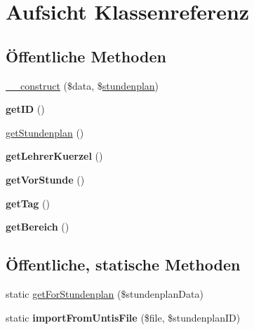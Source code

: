 \hypertarget{class_aufsicht}{}\section{Aufsicht Klassenreferenz}
\label{class_aufsicht}
\subsection*{Öffentliche Methoden}
\begin{DoxyCompactItemize}
\item 
\mbox{\hyperlink{class_aufsicht_a3474101efc393e99f723826c5912d38d}{\+\_\+\+\_\+construct}} (\$data, \$\mbox{\hyperlink{classstundenplan}{stundenplan}})
\item 
\mbox{\label{class_aufsicht_a57a9bed9cc22553584440a72a95c91e6}} 
{\bfseries get\+ID} ()
\item 
\mbox{\hyperlink{class_aufsicht_acf1679305ef0f3b858b5e583a5df43bc}{get\+Stundenplan}} ()
\item 
\mbox{\label{class_aufsicht_aaa83a7ecd03c2cbe6f5a973b25a522ff}} 
{\bfseries get\+Lehrer\+Kuerzel} ()
\item 
\mbox{\label{class_aufsicht_a049ae4143d996866188f71f7f58ec45c}} 
{\bfseries get\+Vor\+Stunde} ()
\item 
\mbox{\label{class_aufsicht_a475c1beca73892066569e031a626f6eb}} 
{\bfseries get\+Tag} ()
\item 
\mbox{\label{class_aufsicht_ad7d888ac33e544a292e6d25c4342cca5}} 
{\bfseries get\+Bereich} ()
\end{DoxyCompactItemize}
\subsection*{Öffentliche, statische Methoden}
\begin{DoxyCompactItemize}
\item 
static \mbox{\hyperlink{class_aufsicht_ae1b14a0d00710021efdbce2f6b29f20f}{get\+For\+Stundenplan}} (\$stundenplan\+Data)
\item 
\mbox{\label{class_aufsicht_a92368d9111d6710cfa2587c58afb3df0}} 
static {\bfseries import\+From\+Untis\+File} (\$file, \$stundenplan\+ID)
\end{DoxyCompactItemize}


